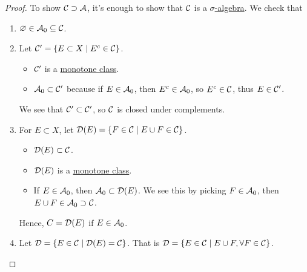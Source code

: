 \begin{proof}
	\par To show \(\mathcal{\MakeUppercase{C}} \supset \mathcal{\MakeUppercase{a}} \), it's enough to show that \(\mathcal{\MakeUppercase{C}} \) is a \hyperref[def:sigma-algebra]{\(\sigma\)-algebra}. We
	check that
	\begin{enumerate}
		\item \(\varnothing \in \mathcal{\MakeUppercase{a}} _0 \subseteq \mathcal{\MakeUppercase{C}} \).
		\item Let \(\mathcal{\MakeUppercase{C}} ^\prime = \{E\subset X \mid E^{c} \in \mathcal{\MakeUppercase{C}} \}\).
		      \begin{itemize}
			      \item \(\mathcal{\MakeUppercase{C}} ^\prime \) is a \hyperref[def:monotone-class]{monotone class}.
			      \item \(\mathcal{\MakeUppercase{a}} _0\subset \mathcal{\MakeUppercase{C}} ^\prime \) because if \(E\in \mathcal{\MakeUppercase{a}} _0\), then \(E^{c} \in \mathcal{\MakeUppercase{a}} _0\), so
			            \(E^{c} \in \mathcal{\MakeUppercase{C}} \), thus \(E\in \mathcal{\MakeUppercase{C}} ^\prime \).
		      \end{itemize}
		      We see that \(\mathcal{\MakeUppercase{C}} ^\prime \subset \mathcal{\MakeUppercase{C}}^\prime \), so \(\mathcal{\MakeUppercase{C}} \) is closed under complements.
		\item For \(E\subset X\), let \(\mathcal{\MakeUppercase{d}} (E) = \{F\in \mathcal{\MakeUppercase{C}} \mid E \cup F\in \mathcal{\MakeUppercase{C}} \}\).
		      \begin{itemize}
			      \item \(\mathcal{\MakeUppercase{d}} (E)\subset \mathcal{\MakeUppercase{C}} \).
			      \item \(\mathcal{\MakeUppercase{D}} (E)\) is a \hyperref[def:monotone-class]{monotone class}.
			      \item If \(E\in \mathcal{\MakeUppercase{a}} _0\), then \(\mathcal{\MakeUppercase{a}} _0\subset \mathcal{\MakeUppercase{D}} (E)\). We see this by picking \(F\in \mathcal{\MakeUppercase{a}} _0\), then
			            \(E\cup F\in \mathcal{\MakeUppercase{a}} _0\supset \mathcal{\MakeUppercase{C}} \).
		      \end{itemize}
		      Hence, \(C = \mathcal{\MakeUppercase{D}} (E)\) if \(E\in \mathcal{\MakeUppercase{a}} _0\).
		\item Let \(\mathcal{\MakeUppercase{d}} = \{E\in \mathcal{\MakeUppercase{C}} \mid \mathcal{\MakeUppercase{d}} (E) = \mathcal{\MakeUppercase{C}} \}\). That is \(\mathcal{\MakeUppercase{d}}  = \{E\in \mathcal{\MakeUppercase{C}} \mid E\cup F, \forall F\in \mathcal{\MakeUppercase{C}} \}\).

\end{enumerate}
\end{proof}
